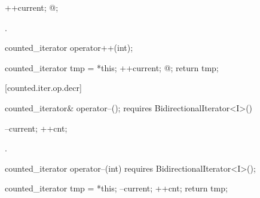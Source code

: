 \begin{addedblock}
\begin{itemdescr}
\pnum
\effects {}
\begin{codeblock}
++current;
@\dcr@cnt;
\end{codeblock}

\pnum
\returns {}.
\end{itemdescr}

%
%
\begin{itemdecl}
counted_iterator operator++(int);
\end{itemdecl}

\begin{itemdescr}
\pnum
\requires {}

\pnum
\effects {}
\begin{codeblock}
counted_iterator tmp = *this;
++current;
@\dcr@cnt;
return tmp;
\end{codeblock}
\end{itemdescr}

[counted.iter.op.decr]{}

%
%
\begin{itemdecl}
  counted_iterator& operator--();
    requires BidirectionalIterator<I>()
\end{itemdecl}

\begin{itemdescr}
\pnum
\effects {}
\begin{codeblock}
--current;
++cnt;
\end{codeblock}

\pnum
\returns {}.
\end{itemdescr}

%
%
\begin{itemdecl}
  counted_iterator operator--(int)
    requires BidirectionalIterator<I>();
\end{itemdecl}

\begin{itemdescr}
\pnum
\effects {}
\begin{codeblock}
counted_iterator tmp = *this;
--current;
++cnt;
return tmp;
\end{codeblock}
\end{itemdescr}


\end{addedblock}
